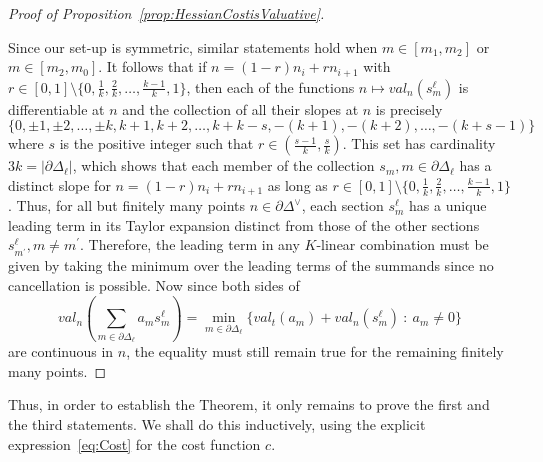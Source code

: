 \documentclass{article}
\begin{document}
\begin{proof}[Proof of Proposition~\ref{prop:HessianCostisValuative}]
\begin{center}
\end{center}
Since our set-up is symmetric, similar statements hold when $m\in [m_1,m_2]$ or $m\in[m_2,m_0]$. It follows that if $n=(1-r)n_i+rn_{i+1}$ with $r \in [0,1]\setminus\{0,\frac{1}{k},\frac{2}{k},\dots,\frac{k-1}{k},1\}$, then each of the functions $n \mapsto val_n(s^\ell_m)$ is differentiable at $n$ and the collection of all their slopes at $n$ is precisely 
\[
\{0,\pm 1,\pm 2,\dots,\pm k, k+1,k+2,\dots, k+k-s, -(k+1),-(k+2),\dots,-(k+s-1)\}
\]
where $s$ is the positive integer such that $r\in (\frac{s-1}{k},\frac{s}{k})$. This set has cardinality $3k = |\partial \Delta_\ell|$, which shows that each member of the collection $s_m, m\in \partial\Delta_\ell$ has a distinct slope for $n = (1-r)n_i + rn_{i+1}$ as long as $r \in [0,1]\setminus\{0,\frac{1}{k},\frac{2}{k},\dots,\frac{k-1}{k},1\}$. Thus, for all but finitely many points $n\in \partial\Delta^\vee$, each section $s^\ell_m$ has a unique leading term in its Taylor expansion distinct from those of the other sections $s^\ell_{m^\prime}, m\neq m^\prime$. Therefore, the leading term in any $K$-linear combination must be given by taking the minimum over the leading terms of the summands since no cancellation is possible. Now since both sides of
\[
val_n\left(\sum_{m\in\partial\Delta_\ell}a_m s^\ell_m\right) = \min_{m\in\partial\Delta_\ell}\{val_t(a_m)+val_n(s^\ell_m) \ : \ a_m \neq 0 \}
\]
are continuous in $n$, the equality must still remain true for the remaining finitely many points.
\end{proof}

Thus, in order to establish the Theorem, it only remains to prove the first and the third statements. We shall do this inductively, using the explicit expression~\eqref{eq:Cost} for the cost function $c$.
\end{document}
